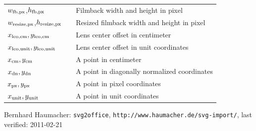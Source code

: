 \documentclass[10pt,a4paper]{article}
\begin{document}
\begin{appendix}
\begin{tabular}{lll}
$w_{\mathrm{fb,px}}$,$h_{\mathrm{fb,px}}$ & & Filmback width and height in pixel \\
$w_{\mathrm{resize,px}}$,$h_{\mathrm{resize,px}}$ & & Resized filmback width and height in pixel \\
$x_{\mathrm{lco,cm}},y_{\mathrm{lco,cm}}$ & & Lens center offset in centimeter \\
$x_{\mathrm{lco,unit}},y_{\mathrm{lco,unit}}$ & & Lens center offset in unit coordinates \\
$x_{\mathrm{cm}},y_{\mathrm{cm}}$ & & A point in centimeter \\
$x_{\mathrm{dn}},y_{\mathrm{dn}}$ & & A point in diagonally normalized coordinates \\
$x_{\mathrm{px}},y_{\mathrm{px}}$ & & A point in pixel coordinates \\
$x_{\mathrm{unit}},y_{\mathrm{unit}}$ & & A point in unit coordinates \\
\end{tabular}
\end{appendix}
\begin{thebibliography}{0cm}
 Bernhard Haumacher: {\tt svg2office}, {\tt http://www.haumacher.de/svg-import/}, last verified: 2011-02-21
\end{thebibliography}
\end{document}
